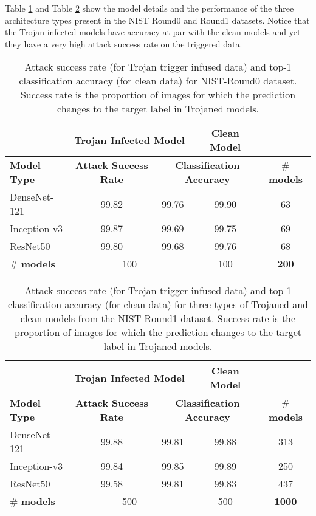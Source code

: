 \documentclass{article}
\begin{document}
Table \ref{tab:NIST0_model} and Table \ref{tab:NIST1_model} show the model details and the performance of the three architecture types present in the NIST Round0 and Round1 datasets.  Notice that the Trojan infected models have accuracy at par with the clean models and yet they have a very high attack success rate on the triggered data.

\begin{table}[h]
        \centering
        \caption{Attack success rate (for Trojan trigger infused data) and top-1 classification accuracy (for clean data) for NIST-Round0 dataset. Success rate is the proportion of images for which the prediction changes to the target label in Trojaned models.}
        \begin{tabular}{|l|c|c|c|c|}
        \hline
& \multicolumn{2}{c|}{\textbf{Trojan Infected Model}} & \textbf{Clean Model} &  \\
        \hline
        \textbf{Model Type} & \textbf{Attack Success Rate} & \multicolumn{2}{c|}{\textbf{Classification Accuracy}} & \# \textbf{models} \\
        \hline \hline
        DenseNet-121 & 99.82 & 99.76 & 99.90 & 63 \\
        Inception-v3 & 99.87 & 99.69 & 99.75 & 69\\
        ResNet50    & 99.80 & 99.68 & 99.76 & 68 \\
        \hline
        \# \textbf{models} & \multicolumn{2}{c|}{100} & 100 & \textbf{200} \\
\hline
    \end{tabular}
        \label{tab:NIST0_model}\end{table}

\vspace{5mm}

\begin{table}[h]
\centering
        \caption{Attack success rate (for Trojan trigger infused data) and top-1 classification accuracy (for clean data) for three types of Trojaned and clean models from the NIST-Round1 dataset. Success rate is the proportion of images for which the prediction changes to the target label in Trojaned models.}
        \begin{tabular}{|l|c|c|c|c|}
        \hline
&  \multicolumn{2}{c|}{\textbf{Trojan Infected Model}} & \textbf{Clean Model} & \\
        \hline
        \textbf{Model Type}  & \textbf{Attack Success Rate} & \multicolumn{2}{c|}{\textbf{Classification Accuracy}} & \# \textbf{models}  \\
        \hline \hline
        DenseNet-121  & 99.88 & 99.81 & 99.88 & 313 \\
        Inception-v3  & 99.84 & 99.85 & 99.89 & 250 \\
        ResNet50     & 99.58 & 99.81 & 99.83 & 437 \\
\hline
        \# \textbf{models} & \multicolumn{2}{c|}{500} & 500 & \textbf{1000} \\
        \hline
    \end{tabular}
        \label{tab:NIST1_model}\end{table}
\end{document}
